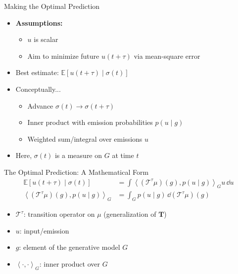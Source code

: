 \documentclass[10pt, aspectratio=169]{beamer}
\begin{document}
\begin{frame}{Making the Optimal Prediction}
	\begin{itemize}\addtolength{\itemsep}{10pt}
		\item \textbf{Assumptions:}
		\begin{itemize}
			\item $u$ is scalar
			\item Aim to minimize future $u(t+\tau)$ via mean-square error
		\end{itemize}
		\pause
		\item Best estimate: $\mathbb{E}[u(t+\tau) \mid \sigma(t)]$
		\pause
		\item Conceptually...
		\begin{itemize}
			\item Advance $\sigma(t) \longrightarrow \sigma(t+\tau)$
			\item Inner product with emission probabilities $p(u \mid g)$
			\item Weighted sum/integral over emissions $u$
		\end{itemize}
		\pause
		\item Here, $\sigma(t)$ is a measure on $G$ at time $t$
	\end{itemize}
\end{frame}

\begin{frame}{The Optimal Prediction: A Mathematical Form}
	\begin{align}
		\mathbb{E}[u(t+\tau) \mid \sigma(t)] &= \int \left< (\mathcal{T}^\tau \mu)(g), p(u \mid g) \right>_G u\, \dd u \\[0.8em]
		\left< (\mathcal{T}^\tau \mu)(g), p(u \mid g) \right>_G &= \int_G p(u \mid g) \, \dd(\mathcal{T}^\tau \mu)(g)
	\end{align}
	\begin{itemize}
		\item $\mathcal{T}^\tau$: transition operator on $\mu$ (generalization of $\mathbf{T}$)
		\item $u$: input/emission
		\item $g$: element of the generative model $G$
		\item $\left< \cdot, \cdot \right>_G$: inner product over $G$
	\end{itemize}
\end{frame}
\end{document}
